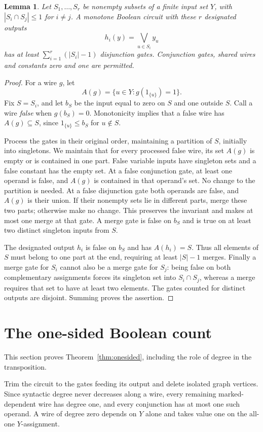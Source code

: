 \documentclass[11pt]{article}
\newtheorem{lemma}[theorem]{Lemma}
\theoremstyle{definition}
\theoremstyle{remark}
\begin{document}
\begin{lemma}\label{lem:orsums}
Let $S_1,\ldots,S_r$ be nonempty subsets of a finite input set $Y$, with $|S_i\cap S_j|\le1$ for $i\ne j$. A monotone Boolean circuit with these $r$ designated outputs
\[
 h_i(y)=\bigvee_{u\in S_i}y_u
\]
has at least $\sum_{i=1}^r(|S_i|-1)$ disjunction gates. Conjunction gates, shared wires and constants zero and one are permitted.
\end{lemma}
\begin{proof}
For a wire $g$, let
\[
 A(g)=\{u\in Y:g(1_{\{u\}})=1\}.
\]
Fix $S=S_i$, and let $b_S$ be the input equal to zero on $S$ and one outside $S$. Call a wire \emph{false} when $g(b_S)=0$. Monotonicity implies that a false wire has $A(g)\subseteq S$, since $1_{\{u\}}\le b_S$ for $u\notin S$.

Process the gates in their original order, maintaining a partition of $S$, initially into singletons. We maintain that for every processed false wire, its set $A(g)$ is empty or is contained in one part. False variable inputs have singleton sets and a false constant has the empty set. At a false conjunction gate, at least one operand is false, and $A(g)$ is contained in that operand's set. No change to the partition is needed. At a false disjunction gate both operands are false, and $A(g)$ is their union. If their nonempty sets lie in different parts, merge these two parts; otherwise make no change. This preserves the invariant and makes at most one merge at that gate. A merge gate is false on $b_S$ and is true on at least two distinct singleton inputs from $S$.

The designated output $h_i$ is false on $b_S$ and has $A(h_i)=S$. Thus all elements of $S$ must belong to one part at the end, requiring at least $|S|-1$ merges. Finally a merge gate for $S_i$ cannot also be a merge gate for $S_j$: being false on both complementary assignments forces its singleton set into $S_i\cap S_j$, whereas a merge requires that set to have at least two elements. The gates counted for distinct outputs are disjoint. Summing proves the assertion.
\end{proof}

\section{The one-sided Boolean count}
This section proves Theorem~\ref{thm:onesided}, including the role of degree in the transposition.

Trim the circuit to the gates feeding its output and delete isolated graph vertices. Since syntactic degree never decreases along a wire, every remaining marked-dependent wire has degree one, and every conjunction has at most one such operand. A wire of degree zero depends on $Y$ alone and takes value one on the all-one $Y$-assignment.
\end{document}
